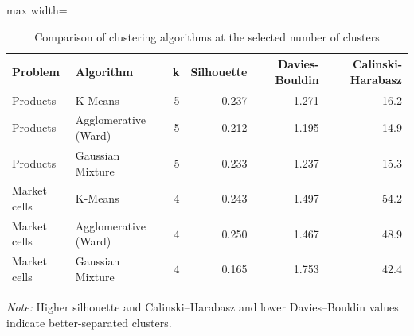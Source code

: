 \begin{table}[htbp]
\centering
\small
\caption{Comparison of clustering algorithms at the selected number of clusters}
\label{tab:clustercompare}
\begin{adjustbox}{max width=\linewidth}
\begin{tabular}{llrrrr}
\toprule
\textbf{Problem} & \textbf{Algorithm} & \textbf{k} & \textbf{Silhouette} & \textbf{Davies-Bouldin} & \textbf{Calinski-Harabasz} \\
\midrule
Products & K-Means & 5 & 0.237 & 1.271 & 16.2 \\
Products & Agglomerative (Ward) & 5 & 0.212 & 1.195 & 14.9 \\
Products & Gaussian Mixture & 5 & 0.233 & 1.237 & 15.3 \\
Market cells & K-Means & 4 & 0.243 & 1.497 & 54.2 \\
Market cells & Agglomerative (Ward) & 4 & 0.250 & 1.467 & 48.9 \\
Market cells & Gaussian Mixture & 4 & 0.165 & 1.753 & 42.4 \\
\bottomrule
\end{tabular}
\end{adjustbox}
\par\smallskip\parbox{0.92\linewidth}{\footnotesize\emph{Note:} Higher silhouette and Calinski--Harabasz and lower Davies--Bouldin values indicate better-separated clusters.}
\end{table}